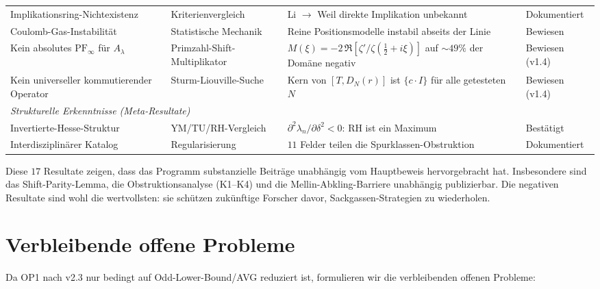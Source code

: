 \documentclass[12pt,a4paper]{article}
\theoremstyle{definition}
\theoremstyle{remark}
\begin{document}
\begin{center}
{\begin{tabular}{p{4.2cm}|p{3.2cm}|p{4.2cm}|l}
Implikationsring-Nichtexistenz & Kriterienvergleich & Li $\to$ Weil direkte Implikation unbekannt & Dokumentiert \\
Coulomb-Gas-Instabilität & Statistische Mechanik & Reine Positionsmodelle instabil abseits der Linie & Bewiesen \\
Kein absolutes $\mathrm{PF}_\infty$ für $A_\lambda$ & Primzahl-Shift-Multiplikator & $M(\xi) = -2\,\Re[\zeta'/\zeta(\tfrac{1}{2}+i\xi)]$ auf $\sim\!49\%$ der Domäne negativ & Bewiesen (v1.4) \\
Kein universeller kommutierender Operator & Sturm-Liouville-Suche & Kern von $[T, D_N(r)]$ ist $\{c \cdot I\}$ für alle getesteten $N$ & Bewiesen (v1.4) \\[4pt]
\multicolumn{4}{l}{\emph{Strukturelle Erkenntnisse (Meta-Resultate)}} \\[2pt]
Invertierte-Hesse-Struktur & YM/TU/RH-Vergleich & $\partial^2\lambda_n/\partial\delta^2 < 0$: RH ist ein Maximum & Bestätigt \\
Interdisziplinärer Katalog & Regularisierung & $11$ Felder teilen die Spurklassen-Obstruktion & Dokumentiert
\end{tabular}}
\end{center}

\noindent Diese $17$ Resultate zeigen, dass das Programm substanzielle Beiträge unabhängig vom Hauptbeweis hervorgebracht hat. Insbesondere sind das Shift-Parity-Lemma, die Obstruktionsanalyse (K1--K4) und die Mellin-Abkling-Barriere unabhängig publizierbar. Die negativen Resultate sind wohl die wertvollsten: sie schützen zukünftige Forscher davor, Sackgassen-Strategien zu wiederholen.


\section{Verbleibende offene Probleme}
\label{sec:open-problems}

Da OP1 nach v2.3 nur bedingt auf Odd-Lower-Bound/AVG reduziert ist, formulieren wir die verbleibenden offenen Probleme:
\end{document}

